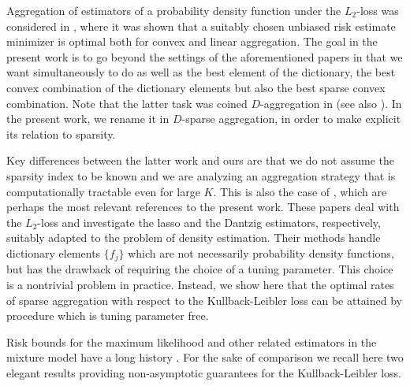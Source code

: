 Aggregation of estimators of a probability density function under the  $L_2$-loss was considered in \citep{RT7}, where it was shown
that a suitably  chosen unbiased risk estimate minimizer is optimal both for convex and linear aggregation. The goal in the present work
is to go beyond the settings of the aforementioned papers in that we want simultaneously to do as well
as the best element of the dictionary, the best convex combination of the dictionary elements but also
the best sparse convex combination. Note that the latter task was coined $D$-aggregation in \citep{Lounici7}
(see also \citep{bunea2007}). In the present work, we rename it in $D$-sparse aggregation, in order to make
explicit its relation to sparsity.

Key differences between the latter work and ours are that we do not assume the sparsity index to be known and we are analyzing
an aggregation strategy that is computationally tractable even for large $K$. This is also the case of \citep{SPADES,Bertin},
which are perhaps the most relevant references to the present work. These papers deal with the $L_2$-loss and investigate the
lasso and the Dantzig estimators, respectively, suitably adapted to the problem of density estimation. Their methods handle dictionary
elements $\{f_j\}$ which are not necessarily probability density functions, but has the drawback of requiring the choice of a
tuning parameter. This choice is a nontrivial problem in practice. Instead, we show here that the optimal rates of sparse
aggregation with respect to the Kullback-Leibler loss can be attained by procedure which is tuning parameter free.

Risk bounds for the maximum likelihood and other related estimators in the mixture model have a long history \citep{LiB99,Li99,Rakhlin5}.
For the sake of comparison we recall here two elegant results providing non-asymptotic guarantees for the Kullback-Leibler loss.


